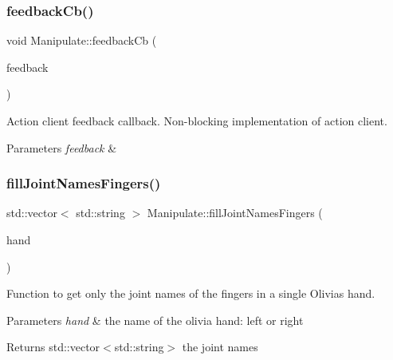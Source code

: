 \subsubsection{\texorpdfstring{feedback\+Cb()}{feedbackCb()}}
{\footnotesize\ttfamily void Manipulate\+::feedback\+Cb (\begin{DoxyParamCaption}\item[{const m3\+\_\+moveit\+::\+Moveit\+Single\+Feedback\+Const\+Ptr \&}]{feedback }\end{DoxyParamCaption})\hspace{0.3cm}{\ttfamily [private]}}



Action client feedback callback. Non-\/blocking implementation of action client. 


\begin{DoxyParams}{Parameters}
{\em feedback} & \\
\hline
\end{DoxyParams}
\mbox{\label{structManipulate_a08707bdbba233e0375b6d79b69c413da}} 
\subsubsection{\texorpdfstring{fill\+Joint\+Names\+Fingers()}{fillJointNamesFingers()}}
{\footnotesize\ttfamily std\+::vector$<$ std\+::string $>$ Manipulate\+::fill\+Joint\+Names\+Fingers (\begin{DoxyParamCaption}\item[{std\+::string}]{hand }\end{DoxyParamCaption})\hspace{0.3cm}{\ttfamily [private]}}



Function to get only the joint names of the fingers in a single Olivia\textquotesingle{}s hand. 


\begin{DoxyParams}{Parameters}
{\em hand} & the name of the olivia hand\+: left or right \\
\hline
\end{DoxyParams}
\begin{DoxyReturn}{Returns}
std\+::vector$<$std\+::string$>$ the joint names 
\end{DoxyReturn}
\mbox{\label{structManipulate_a3cba926b57fd0e0ab0219b992504bd1c}} 
